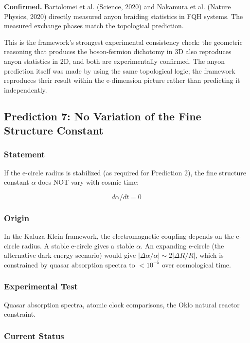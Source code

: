 \documentclass[aps,prd,preprint,superscriptaddress,longbibliography,floatfix]{revtex4-2}
\theoremstyle{remark}
\begin{document}
\textbf{Confirmed.} Bartolomei et al. (Science, 2020) and Nakamura et al. (Nature Physics, 2020) directly measured anyon braiding statistics in FQH systems. The measured exchange phases match the topological prediction.

This is the framework's strongest experimental consistency check: the geometric reasoning that produces the boson-fermion dichotomy in 3D also reproduces anyon statistics in 2D, and both are experimentally confirmed. The anyon prediction itself was made by \cite{LeinaasMyrhei1977} using the same topological logic; the framework reproduces their result within the e-dimension picture rather than predicting it independently.



\subsection{Prediction 7: No Variation of the Fine Structure Constant}


\subsubsection{Statement}

If the e-circle radius is stabilized (as required for Prediction 2), the fine structure constant $\alpha$ does NOT vary with cosmic time:


\begin{equation}
    d\alpha/dt = 0
\end{equation}

\subsubsection{Origin}

In the Kaluza-Klein framework, the electromagnetic coupling depends on the e-circle radius. A stable e-circle gives a stable $\alpha$. An expanding e-circle (the alternative dark energy scenario) would give $|\Delta\alpha/\alpha| \sim  2|\Delta R/R|$, which is constrained by quasar absorption spectra to $< 10^{-5}$ over cosmological time.


\subsubsection{Experimental Test}

Quasar absorption spectra, atomic clock comparisons, the Oklo natural reactor constraint.


\subsubsection{Current Status}
\end{document}
